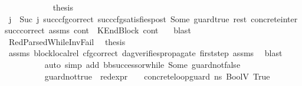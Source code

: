 \begin{isabellebody}
\isanewline
\ \ \ \ \ \ \ \ \ \ \isamarkupfalse%
\ {\isacharquery}{\kern0pt}thesis\ \isamarkupfalse%
\ {\isacartoucheopen}j\ {\isacharequal}{\kern0pt}\ Suc\ j{\isacharprime}{\kern0pt}{\isacartoucheclose}\ succ{\isacharunderscore}{\kern0pt}cfg{\isacharunderscore}{\kern0pt}correct\ succ{\isacharunderscore}{\kern0pt}cfg{\isacharunderscore}{\kern0pt}satisfies{\isacharunderscore}{\kern0pt}post\ Some\ guard{\isacharunderscore}{\kern0pt}true\ rest\ concrete{\isacharunderscore}{\kern0pt}inter{}\ succ{\isacharunderscore}{\kern0pt}correct\ assms{\isacharparenleft}{\kern0pt}{}{\isacharparenright}{\kern0pt}\ {\isacartoucheopen}cont{}\ {\isacharequal}{\kern0pt}\ KEndBlock\ cont{}{\isacartoucheclose}\ \ \isamarkupfalse%
\ blast\ \isanewline
\ \ \ \ \ \ \ \ \isamarkupfalse%
\ \isanewline
\ \ \ \ \ \ \ \ \ \ \isamarkupfalse%
\ RedParsedWhile{\isacharunderscore}{\kern0pt}InvFail\ \isamarkupfalse%
\ {\isacharquery}{\kern0pt}thesis\ \isamarkupfalse%
\ assms{\isacharparenleft}{\kern0pt}{}{\isacharparenright}{\kern0pt}\ block{\isacharunderscore}{\kern0pt}local{\isacharunderscore}{\kern0pt}rel\ cfg{\isacharunderscore}{\kern0pt}correct\ dag{\isacharunderscore}{\kern0pt}verifies{\isacharunderscore}{\kern0pt}propagate{\isacharunderscore}{\kern0pt}{}\ first{\isacharunderscore}{\kern0pt}step\ assms{\isacharparenleft}{\kern0pt}{}{\isacharparenright}{\kern0pt}\ \isamarkupfalse%
\ blast\isanewline
\ \ \ \ \ \ \ \ \isamarkupfalse%
\ {\isacharparenleft}{\kern0pt}auto\ simp\ add{\isacharcolon}{\kern0pt}\ bb{\isacharunderscore}{\kern0pt}successor{\isacharunderscore}{\kern0pt}while\ Some\ guard{\isacharunderscore}{\kern0pt}not{\isacharunderscore}{\kern0pt}false{\isacharparenright}{\kern0pt}\isanewline
\ \ \ \ \ \ \isamarkupfalse%
\isanewline
\ \ \ \ \ \ \ \ \isamarkupfalse%
\ guard{\isacharunderscore}{\kern0pt}not{\isacharunderscore}{\kern0pt}true{\isacharcolon}{\kern0pt}\ {\isachardoublequoteopen}{\isasymnot}\ {\isacharparenleft}{\kern0pt}red{\isacharunderscore}{\kern0pt}expr\ {\isasymLambda}\ {\isasymGamma}\ {\isasymOmega}\ concrete{\isacharunderscore}{\kern0pt}loop{\isacharunderscore}{\kern0pt}guard\ ns{}\ {\isacharparenleft}{\kern0pt}BoolV\ True{\isacharparenright}{\kern0pt}{\isacharparenright}{\kern0pt}{\isachardoublequoteclose}\isanewline
\ \ \ \ \ \ \ \ \isamarkupfalse%

\end{isabellebody}
